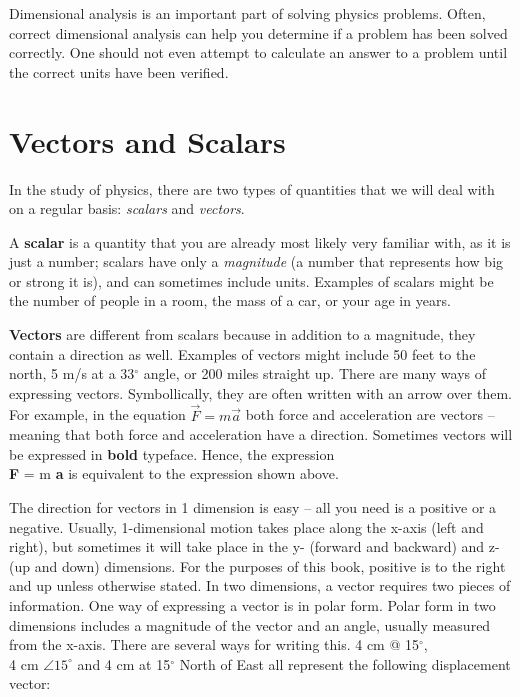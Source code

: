 	Dimensional analysis is an important part of solving physics problems.  Often, correct dimensional analysis can help you determine if a problem has been solved correctly.  One should not even attempt to calculate an answer to a problem until the correct units have been verified. 



		


\section{Vectors and Scalars}
In the study of physics, there are two types of quantities that we will deal with on a regular basis: \textit{scalars} and \textit{vectors}.  

A \textbf{scalar} is a quantity that you are already most likely very familiar with, as it is just a number; scalars have only a \textit{magnitude} (a number that represents how big or strong it is), and can sometimes include units.  Examples of scalars might be the number of people in a room, the mass of a car, or your age in years.  

\textbf{Vectors} are different from scalars because in addition to a magnitude, they contain a direction as well.  Examples of vectors might include 50 feet to the north, 5 m/s at a 33$^\circ$ angle, or 200 miles straight up.  
There are many ways of expressing vectors.  Symbollically, they are often written with an arrow over them.  For example, in the equation \color{blue} $\vec{F} = m \vec{a}$ \color{black}  both force and acceleration are vectors – meaning that both force and acceleration have a direction.  Sometimes vectors will be expressed in \textbf{bold} typeface.   Hence, the expression \\ \color{blue} \textbf{F} = m \textbf{a}  \color{black} is equivalent to the expression shown above.

The direction for vectors in 1 dimension is easy – all you need is a positive or a negative.  Usually, 1-dimensional motion takes place along the x-axis (left and right), but sometimes it will take place in the y- (forward and backward) and z- (up and down) dimensions.  For the purposes of this book, positive is to the right and up unless otherwise stated. 
In two dimensions, a vector requires two pieces of information.  One way of expressing a vector is in polar form.  Polar form in two dimensions includes a magnitude of the vector and an angle, usually measured from the x-axis.  There are several ways for writing this.  4 cm @ 15$^\circ$, \\ 4 cm $\angle 15^\circ$ and 4 cm at 15$^\circ$ North of East all represent the following displacement vector:



